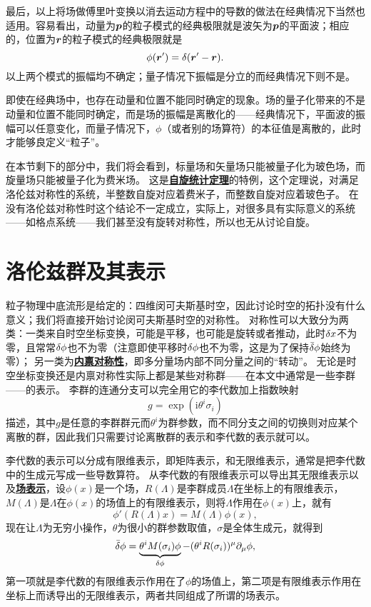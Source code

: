 \documentclass[hyperref, UTF8, a4paper]{ctexart}
\newcommand*{\ii}{\mathrm{i}}
\newcommand{\concept}[1]{\underline{\textbf{#1}}}
\begin{document}
最后，以上将场做傅里叶变换以消去运动方程中的导数的做法在经典情况下当然也适用。容易看出，动量为$\vb*{p}$的粒子模式的经典极限就是波矢为$\vb*{p}$的平面波；相应的，位置为$\vb*{r}$的粒子模式的经典极限就是
\[
    \phi(\vb*{r}') = \delta(\vb*{r}' - \vb*{r}).
\]
以上两个模式的振幅均不确定；量子情况下振幅是分立的而经典情况下则不是。

即使在经典场中，也存在动量和位置不能同时确定的现象。场的量子化带来的不是动量和位置不能同时确定，而是场的振幅是离散化的——经典情况下，平面波的振幅可以任意变化，而量子情况下，${\phi}$（或者别的场算符）的本征值是离散的，此时才能够良定义“粒子”。

在本节剩下的部分中，我们将会看到，标量场和矢量场只能被量子化为玻色场，而旋量场只能被量子化为费米场。
这是\concept{自旋统计定理}的特例，这个定理说，对满足洛伦兹对称性的系统，半整数自旋对应着费米子，而整数自旋对应着玻色子。
在没有洛伦兹对称性时这个结论不一定成立，实际上，对很多具有实际意义的系统——如格点系统——我们甚至没有旋转对称性，所以也无从讨论自旋。

\section{洛伦兹群及其表示}\label{sec:symmetry}

粒子物理中底流形是给定的：四维闵可夫斯基时空，因此讨论时空的拓扑没有什么意义；我们将直接开始讨论闵可夫斯基时空的对称性。
对称性可以大致分为两类：一类来自时空坐标变换，可能是平移，也可能是旋转或者推动，此时$\var{x}$不为零，且常常$\var{\phi}$也不为零（注意即使平移时$\var{\phi}$也不为零，这是为了保持$\bar{\var}{\phi}$始终为零）；
另一类为\concept{内禀对称性}，即多分量场内部不同分量之间的“转动”。
无论是时空坐标变换还是内禀对称性实际上都是某些对称群——在本文中通常是一些李群——的表示。
李群的连通分支可以完全用它的李代数加上指数映射
\[
    g = \exp(\ii \theta^i \sigma_i)
\]
描述，其中$g$是任意的李群群元而$\theta^i$为群参数，而不同分支之间的切换则对应某个离散的群，因此我们只需要讨论离散群的表示和李代数的表示就可以。

李代数的表示可以分成有限维表示，即矩阵表示，和无限维表示，通常是把李代数中的生成元写成一些导数算符。
从李代数的有限维表示可以导出其无限维表示以及\concept{场表示}，设$\phi(x)$是一个场，$R(\Lambda)$是李群成员$\Lambda$在坐标上的有限维表示，$M(\Lambda)$是$\Lambda$在$\phi(x)$的场值上的有限维表示，则将$\Lambda$作用在$\phi(x)$上，就有
\[
    \phi'(R(\Lambda) x) = M(\Lambda) \phi(x),
\]
现在让$\Lambda$为无穷小操作，$\theta$为很小的群参数取值，$\sigma$是全体生成元，就得到
\begin{equation}
    \bar{\var}{\phi} = \underbrace{\theta^i M(\sigma_i) \phi}_{{\var{\phi}}} - (\theta^i R(\sigma_i))^\mu \partial_\mu \phi,
\end{equation}
第一项就是李代数的有限维表示作用在了$\phi$的场值上，第二项是有限维表示作用在坐标上而诱导出的无限维表示，两者共同组成了所谓的场表示。
\end{document}
